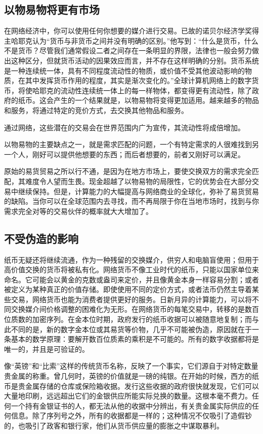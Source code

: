 \subsection{以物易物将更有市场}
在网络经济中，你可以使用任何你想要的媒介进行交易。已故的诺贝尔经济学奖得主哈耶克认为“货币与非货币之间并没有明确的区别。”他写到：“什么是货币，什么不是货币？尽管我们通常假设二者之间存在一条明显的界限，法律也一般会努力做出这种区分，但就货币活动的因果效应而言，并不存在这样明确的分别。货币系统是一种连续统一体，具有不同程度流动性的物质，或价值不受其他波动影响的物质，在其中发挥货币作用的程度，其实是渐次变化的。”全球计算机网络上的数字货币，将使哈耶克的流动性连续统一体上的每一样物体，都变得更有流动性，除了政府的纸币。这会产生的一个结果就是，以物易物将变得更加适用。越来越多的物品和服务，将通过特定的竞价方式，去交换其他物品和服务。

通过网络，这些潜在的交易会在世界范围内广为宣传，其流动性将成倍增加。

以物易物的主要缺点之一，就是需求匹配的问题，一个有特定需求的人很难找到另一个人，刚好可以提供他想要的东西；而后者想要的，前者又刚好可以满足。

原始的易货贸易之所以行不通，是因为在地方市场上，要使交换双方的需求完全匹配，其难度令人望而生畏。现金超越了以物易物的局限性，它的优势会在大部分交易中继续保持。但是，计算能力的大幅提高与网络商业的全球化，弥补了易货贸易的缺陷。当你可以在全球范围内去寻找，而不再局限于你在当地市场时，找到与你需求完全对等的交易伙伴的概率就大大增加了。

\subsection{不受伪造的影响}
纸币无疑还将继续流通，作为一种残留的交换媒介，供穷人和电脑盲使用；但用于高价值交换的货币将被私有化。网络货币不像工业时代的纸币，只能以国家单位来命名。它可能会以黄金的克数或盎司来定价，并且像黄金本身一样容易分割；或者被定义为某种真正的价值存储。即使使用不同的定价方式，或者法币仍然主导着某些交易，网络货币也能为消费者提供更好的服务。日新月异的计算能力，可以将不同交换媒介间价格调整的困难化为无形。在网络货币的每笔交易中，转移的是数百位质数的加密序列。在金本位时期，政府发行的纸币收据可以被随意地复制；而与此不同的是，新的数字金本位或其易货等价物，几乎不可能被伪造，原因就在于一条基本的数学原理：要解开数百位质素的乘积是不可能的。所有的数字收据都将是唯一的，并且是可验证的。

像“英镑”和“比索”这样的传统货币名称，反映了一个事实，它们源自于对特定数量贵金属的称重。曾几何时，英镑的价值就是一磅的纯银。在开始的时候，西方的纸币是贵金属存储的仓库或保险箱收据。发行这些收据的政府很快就发现，它们可以大量地印刷，远远超出它们的金银供应所能实际兑换的数量。这根本毫不费力。任何一个持有金银证书的人，都无法从他的收据中分辨出，有关贵金属实际供应的任何信息。除了序列号之外，所有的收据都是一样的；这种情况不仅吸引了造假钞的，也吸引了政客和银行家，他们从货币供应量的膨胀之中谋取暴利。


